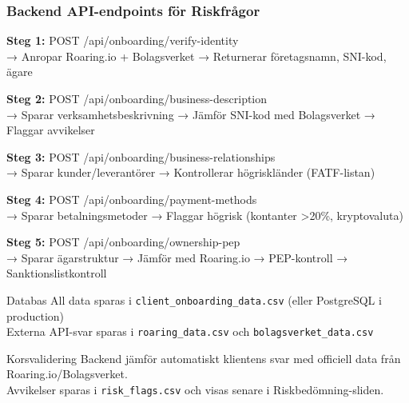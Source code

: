 \documentclass[10pt]{beamer}
\begin{document}
\begin{frame}[label=riskfragor-api]
  \frametitle{Backend API-endpoints för Riskfrågor}

  \footnotesize

  \textbf{Steg 1:} POST /api/onboarding/verify-identity\\
  \tiny → Anropar Roaring.io + Bolagsverket → Returnerar företagsnamn, SNI-kod, ägare

  \vspace{0.3cm}

  \textbf{Steg 2:} POST /api/onboarding/business-description\\
  \tiny → Sparar verksamhetsbeskrivning → Jämför SNI-kod med Bolagsverket → Flaggar avvikelser

  \vspace{0.3cm}

  \textbf{Steg 3:} POST /api/onboarding/business-relationships\\
  \tiny → Sparar kunder/leverantörer → Kontrollerar högriskländer (FATF-listan)

  \vspace{0.3cm}

  \textbf{Steg 4:} POST /api/onboarding/payment-methods\\
  \tiny → Sparar betalningsmetoder → Flaggar högrisk (kontanter >20\%, kryptovaluta)

  \vspace{0.3cm}

  \textbf{Steg 5:} POST /api/onboarding/ownership-pep\\
  \tiny → Sparar ägarstruktur → Jämför med Roaring.io → PEP-kontroll → Sanktionslistkontroll

  \vspace{0.5cm}

  \begin{alertblock}{Databas}
    \tiny All data sparas i \texttt{client\_onboarding\_data.csv} (eller PostgreSQL i production)\\
    Externa API-svar sparas i \texttt{roaring\_data.csv} och \texttt{bolagsverket\_data.csv}
  \end{alertblock}

  \vspace{0.3cm}

  \begin{block}{Korsvalidering}
    \tiny Backend jämför automatiskt klientens svar med officiell data från Roaring.io/Bolagsverket.\\
    Avvikelser sparas i \texttt{risk\_flags.csv} och visas senare i Riskbedömning-sliden.
  \end{block}
\end{frame}
\end{document}
